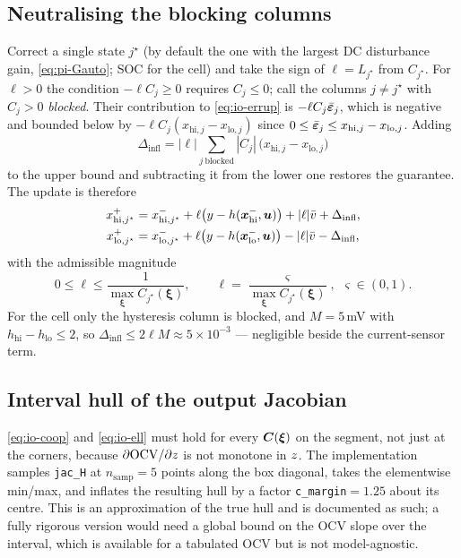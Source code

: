 \subsection{Neutralising the blocking columns}
Correct a single state $j^\star$ (by default the one with the largest DC disturbance gain,
\eqref{eq:pi-Gauto}; SOC for the cell) and take the sign of $\ell = L_{j^\star}$ from
$C_{j^\star}$.  For $\ell>0$ the condition $-\ell C_j\ge0$ requires $C_j\le0$; call the columns
$j\ne j^\star$ with $C_j>0$ \emph{blocked}.  Their contribution to \eqref{eq:io-errup} is
$-\ell C_j\bar{\bm{\varepsilon}}_j$, which is negative and bounded below by
$-\ell C_j(x_{\mathrm{hi},j}-x_{\mathrm{lo},j})$ since $0\le\bar{\bm{\varepsilon}}_j\le
x_{\mathrm{hi},j}-x_{\mathrm{lo},j}$.  Adding
\begin{equation}
\Delta_{\mathrm{infl}} = |\ell|\sum_{j\ \mathrm{blocked}} |C_j|\,\big(x_{\mathrm{hi},j}-x_{\mathrm{lo},j}\big)
\label{eq:io-infl}
\end{equation}
to the upper bound and subtracting it from the lower one restores the guarantee.  The update is
therefore
\begin{align}
x^+_{\mathrm{hi},j^\star} &= x^-_{\mathrm{hi},j^\star} + \ell\big(y - h(\bm{x}^-_{\mathrm{hi}},\bm{u})\big) + |\ell|\bar{v} + \Delta_{\mathrm{infl}} , \label{eq:io-updhi}\\
x^+_{\mathrm{lo},j^\star} &= x^-_{\mathrm{lo},j^\star} + \ell\big(y - h(\bm{x}^-_{\mathrm{lo}},\bm{u})\big) - |\ell|\bar{v} - \Delta_{\mathrm{infl}} , \label{eq:io-updlo}
\end{align}
with the admissible magnitude
\begin{equation}
0 \le \ell \le \frac{1}{\max_{\bm{\xi}} C_{j^\star}(\bm{\xi})} ,
\qquad \ell = \frac{\varsigma}{\max_{\bm{\xi}} C_{j^\star}(\bm{\xi})} ,\ \ \varsigma\in(0,1) .
\label{eq:io-ell}
\end{equation}
For the cell only the hysteresis column is blocked, and $M = 5$\,mV with
$h_{\mathrm{hi}}-h_{\mathrm{lo}}\le2$, so $\Delta_{\mathrm{infl}}\le 2\ell M \approx 5\times10^{-3}$
--- negligible beside the current-sensor term.

\subsection{Interval hull of the output Jacobian}
\eqref{eq:io-coop} and \eqref{eq:io-ell} must hold for every $\bm{C}(\bm{\xi})$ on the segment, not
just at the corners, because $\partial\mathrm{OCV}/\partial z$ is not monotone in $z$.  The
implementation samples \texttt{jac\_H} at $n_{\mathrm{samp}}=5$ points along the box diagonal,
takes the elementwise min/max, and inflates the resulting hull by a factor
\texttt{c\_margin}$=1.25$ about its centre.  This is an approximation of the true hull and is
documented as such; a fully rigorous version would need a global bound on the OCV slope over the
interval, which is available for a tabulated OCV but is not model-agnostic.

